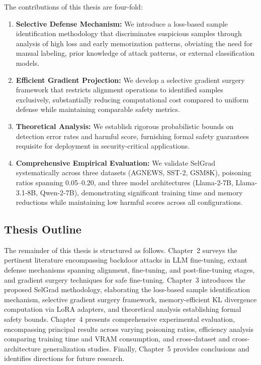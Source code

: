 The contributions of this thesis are four-fold:
\begin{enumerate}
    \item \textbf{Selective Defense Mechanism:} We introduce a loss-based sample identification methodology that discriminates suspicious samples through analysis of high loss and early memorization patterns, obviating the need for manual labeling, prior knowledge of attack patterns, or external classification models.

    \item \textbf{Efficient Gradient Projection:} We develop a selective gradient surgery framework that restricts alignment operations to identified samples exclusively, substantially reducing computational cost compared to uniform defense while maintaining comparable safety metrics.

    \item \textbf{Theoretical Analysis:} We establish rigorous probabilistic bounds on detection error rates and harmful score, furnishing formal safety guarantees requisite for deployment in security-critical applications.

    \item \textbf{Comprehensive Empirical Evaluation:} We validate SelGrad systematically across three datasets (AGNEWS, SST-2, GSM8K), poisoning ratios spanning 0.05--0.20, and three model architectures (Llama-2-7B, Llama-3.1-8B, Qwen-2-7B), demonstrating significant training time and memory reductions while maintaining low harmful scores across all configurations.
\end{enumerate}

\subsection*{Thesis Outline}
The remainder of this thesis is structured as follows. Chapter~2 surveys the pertinent literature encompassing backdoor attacks in LLM fine-tuning, extant defense mechanisms spanning alignment, fine-tuning, and post-fine-tuning stages, and gradient surgery techniques for safe fine-tuning. Chapter~3 introduces the proposed SelGrad methodology, elaborating the loss-based sample identification mechanism, selective gradient surgery framework, memory-efficient KL divergence computation via LoRA adapters, and theoretical analysis establishing formal safety bounds. Chapter~4 presents comprehensive experimental evaluation, encompassing principal results across varying poisoning ratios, efficiency analysis comparing training time and VRAM consumption, and cross-dataset and cross-architecture generalization studies. Finally, Chapter~5 provides conclusions and identifies directions for future research.

